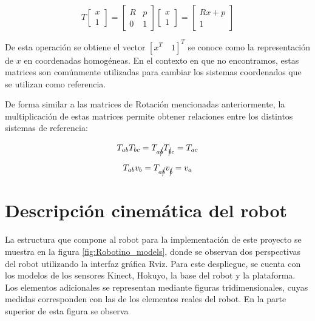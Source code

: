 \begin{equation*}
    T \begin{bmatrix}
        x\\1
    \end{bmatrix} = 
    \begin{bmatrix}
	R & p\\
	0 & 1 
	\end{bmatrix}
    \begin{bmatrix}
	x\\
	1 
	\end{bmatrix}=
    \begin{bmatrix}
	Rx + p\\
    1 
	\end{bmatrix}
\end{equation*}

De esta operación se obtiene el vector $ \left[x^{T}\quad 1\right]^{T}$ se conoce como la representación de $x$ en coordenadas homogéneas. En el contexto en que no encontramos, estas matrices son comúnmente utilizadas para cambiar los sistemas coordenados que se utilizan como referencia. 

De forma similar a las matrices de Rotación mencionadas anteriormente, la multiplicación de estas matrices permite obtener relaciones entre los distintos sistemas de referencia:

\begin{equation*}
    T_{ab}T_{bc} = T_{a\cancel{b}}T_{\cancel{b}c}=T_{ac}
\end{equation*}

\begin{equation*}
    T_{ab}v_{b} = T_{a\cancel{b}}v_{\cancel{b}}=v_{a}
\end{equation*}

\section{Descripción cinemática del robot}

La estructura que compone al robot para la implementación de este proyecto se muestra en la figura \ref{fig:Robotino_models}, donde se observan dos perspectivas del robot utilizando la interfaz gráfica Rviz. Para este despliegue, se cuenta con los modelos de los sensores Kinect, Hokuyo, la base del robot y la plataforma. Los elementos adicionales se representan mediante figuras tridimensionales, cuyas medidas corresponden con las de los elementos reales del robot. En la parte superior de esta figura se observa 

